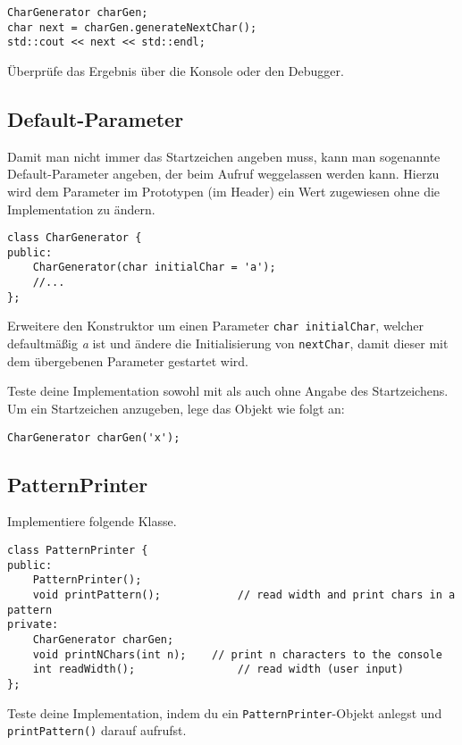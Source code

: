 \begin{lstlisting}
CharGenerator charGen;
char next = charGen.generateNextChar();
std::cout << next << std::endl;
\end{lstlisting}

Überprüfe das Ergebnis über die Konsole oder den Debugger.


\subsection{Default-Parameter}
Damit man nicht immer das Startzeichen angeben muss, kann man sogenannte Default-Parameter angeben, der beim Aufruf weggelassen werden kann.
Hierzu wird dem Parameter im Prototypen (im Header) ein Wert zugewiesen ohne die Implementation zu ändern.

\begin{lstlisting}
class CharGenerator {
public:
	CharGenerator(char initialChar = 'a');
	//...
};
\end{lstlisting}

Erweitere den Konstruktor um einen Parameter \lstinline{char initialChar}, welcher defaultmäßig \emph{a} ist und ändere die Initialisierung von \lstinline{nextChar}, damit dieser mit dem übergebenen Parameter gestartet wird.

Teste deine Implementation sowohl mit als auch ohne Angabe des Startzeichens.
Um ein Startzeichen anzugeben, lege das Objekt wie folgt an:

\begin{lstlisting}
CharGenerator charGen('x');
\end{lstlisting}


\subsection{PatternPrinter}
Implementiere folgende Klasse.

\begin{lstlisting}
class PatternPrinter {
public:
	PatternPrinter();
	void printPattern();			// read width and print chars in a pattern
private:
	CharGenerator charGen;
	void printNChars(int n);	// print n characters to the console
	int readWidth();				// read width (user input)
};
\end{lstlisting}

Teste deine Implementation, indem du ein \lstinline{PatternPrinter}-Objekt anlegst und \lstinline{printPattern()} darauf aufrufst.

